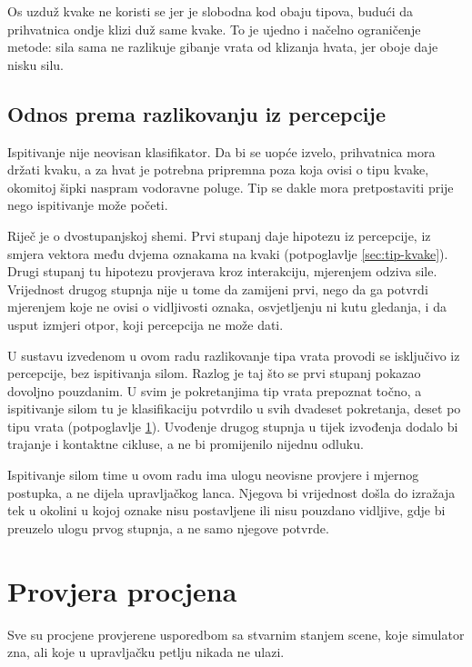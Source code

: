 Os uzduž kvake ne koristi se jer je slobodna kod obaju tipova, budući da prihvatnica ondje klizi
duž same kvake. To je ujedno i načelno ograničenje metode: sila sama ne razlikuje gibanje vrata od
klizanja hvata, jer oboje daje nisku silu.

\subsection{Odnos prema razlikovanju iz percepcije}

Ispitivanje nije neovisan klasifikator. Da bi se uopće izvelo, prihvatnica mora držati kvaku, a za
hvat je potrebna pripremna poza koja ovisi o tipu kvake, okomitoj šipki naspram vodoravne poluge.
Tip se dakle mora pretpostaviti prije nego ispitivanje može početi.

Riječ je o dvostupanjskoj shemi. Prvi stupanj daje hipotezu iz percepcije, iz smjera vektora među
dvjema oznakama na kvaki (potpoglavlje \ref{sec:tip-kvake}). Drugi stupanj tu hipotezu provjerava
kroz interakciju, mjerenjem odziva sile. Vrijednost drugog stupnja nije u tome da zamijeni prvi,
nego da ga potvrdi mjerenjem koje ne ovisi o vidljivosti oznaka, osvjetljenju ni kutu gledanja, i
da usput izmjeri otpor, koji percepcija ne može dati.

U sustavu izvedenom u ovom radu razlikovanje tipa vrata provodi se isključivo iz
percepcije, bez ispitivanja silom. Razlog je taj što se prvi stupanj pokazao dovoljno pouzdanim.
U svim je pokretanjima tip vrata prepoznat točno, a ispitivanje silom tu je klasifikaciju potvrdilo
u svih dvadeset pokretanja, deset po tipu vrata (potpoglavlje \ref{sec:provjera}). Uvođenje drugog
stupnja u tijek izvođenja dodalo bi trajanje i kontaktne cikluse, a ne bi promijenilo nijednu
odluku.

Ispitivanje silom time u ovom radu ima ulogu neovisne provjere i mjernog postupka, a ne dijela
upravljačkog lanca. Njegova bi vrijednost došla do izražaja tek u okolini u kojoj oznake nisu
postavljene ili nisu pouzdano vidljive, gdje bi preuzelo ulogu prvog stupnja, a ne samo njegove
potvrde.

\section{Provjera procjena}
\label{sec:provjera}

Sve su procjene provjerene usporedbom sa stvarnim stanjem scene, koje simulator zna, ali koje u
upravljačku petlju nikada ne ulazi.


